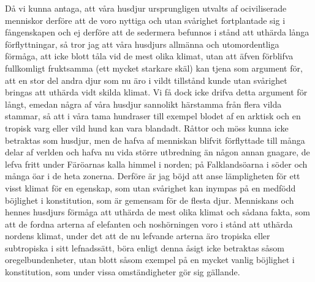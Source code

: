 Då vi kunna antaga, att våra husdjur ursprungligen utvalts af ociviliserade menniskor derföre att de voro nyttiga och utan svårighet fortplantade sig i fångenskapen och ej derföre att de sedermera befunnos i stånd att uthärda långa förflyttningar, så tror jag att våra husdjurs allmänna och utomordentliga förmåga, att icke blott tåla vid de mest olika klimat, utan att äfven förblifva fullkomligt fruktsamma (ett mycket starkare skäl) kan tjena som argument för, att en stor del andra djur som nu äro i vildt tillstånd kunde utan svårighet bringas att uthärda vidt skilda klimat. Vi få dock icke drifva detta argument för långt, emedan några af våra husdjur sannolikt härstamma från flera vilda stammar, så att i våra tama hundraser till exempel blodet af en arktisk och en tropisk varg eller vild hund kan vara blandadt. Råttor och möss kunna icke betraktas som husdjur, men de hafva af menniskan blifvit förflyttade till många delar af verlden och hafva nu vida större utbredning än någon annan gnagare, de lefva fritt under Färöarnas kalla himmel i norden; på Falklandsöarna i söder och många öar i de heta zonerna. Derföre är jag böjd att anse lämpligheten för ett visst klimat för en egenskap, som utan svårighet kan inympas på en medfödd böjlighet i konstitution, som är gemensam för de flesta djur. Menniskans och hennes husdjurs förmåga att uthärda de mest olika klimat och sådana fakta, som att de fordna arterna af elefanten och noshörningen voro i stånd att uthärda nordens klimat, under det att de nu lefvande arterna äro tropiska eller subtropiska i sitt lefnadssätt, böra enligt denna åsigt icke betraktas såsom oregelbundenheter, utan blott såsom exempel på en mycket vanlig böjlighet i konstitution, som under vissa omständigheter gör sig gällande.

